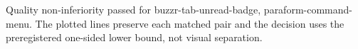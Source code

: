 Quality non-inferiority passed for buzzr-tab-unread-badge, paraform-command-menu. The plotted lines preserve each matched pair and the decision uses the preregistered one-sided lower bound, not visual separation.
